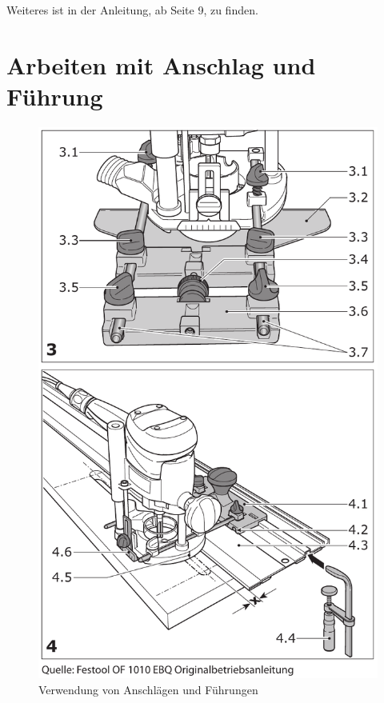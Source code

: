 \documentclass{\basedir/fablab-document}
\begin{document}
Weiteres ist in der Anleitung, ab Seite 9, zu finden.

\section{Arbeiten mit Anschlag und Führung}
\begin{figure}[h!]
    \centering
    \includegraphics{bilder/fuehrung-sketch}
    \caption{Verwendung von Anschlägen und Führungen}
    \label{fig:drehzahl}
\end{figure}
\end{document}
